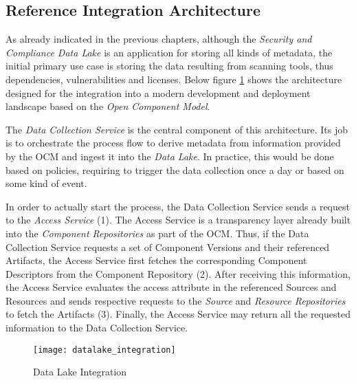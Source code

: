 \subsection{Reference Integration Architecture} \label{sec:Reference Integration Architecture}
As already indicated in the previous chapters, although the \emph{Security and Compliance Data Lake} is an application for storing all kinds of metadata, the initial primary use case is storing the data resulting from scanning tools, thus dependencies, vulnerabilities and licenses. Below figure \ref{fig:DataLakeIntegration} shows the architecture designed for the integration into a modern development and deployment landscape based on the \emph{Open Component Model}.\par
The \emph{Data Collection Service} is the central component of this architecture. Its job is to orchestrate the process flow to derive metadata from information provided by the OCM and ingest it into the \emph{Data Lake}. In practice, this would be done based on policies, requiring to trigger the data collection once a day or based on some kind of event.\par 
In order to actually start the process, the Data Collection Service sends a request to the \emph{Access Service} (1). The Access Service is a transparency layer already built into the \emph{Component Repositories} as part of the OCM. Thus, if the Data Collection Service requests a set of Component Versions and their referenced Artifacts, the Access Service first fetches the corresponding Component Descriptors from the Component Repository (2). After receiving this information, the Access Service evaluates the access attribute in the referenced Sources and Resources and sends respective requests to the \emph{Source} and \emph{Resource Repositories} to fetch the Artifacts (3). Finally, the Access Service may return all the requested information to the Data Collection Service.\par

\begin{figure}[H]
	\centering
	\texttt{[image: datalake\_integration]}
	\caption[Data Lake Integration]{Data Lake Integration }
	\label{fig:DataLakeIntegration}
\end{figure}

